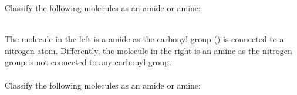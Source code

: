 \documentclass[main.tex]{subfiles}
\begin{document}
\begin{description}
\begin{example} %
Classify the following molecules as an amide or amine:
\begin{center} \hspace{0.5cm}  \end{center}
\\
The molecule in the left is a amide as the carbonyl group () is connected to a nitrogen atom. Differently, the molecule in the right is an amine as the nitrogen group is not connected to any carbonyl group.
\\
\faDiamond\ \\
Classify the following molecules as an amide or amine:
\begin{center}    \hspace{0.5cm}     \end{center}

\end{example}%







\end{description}
\end{document}
